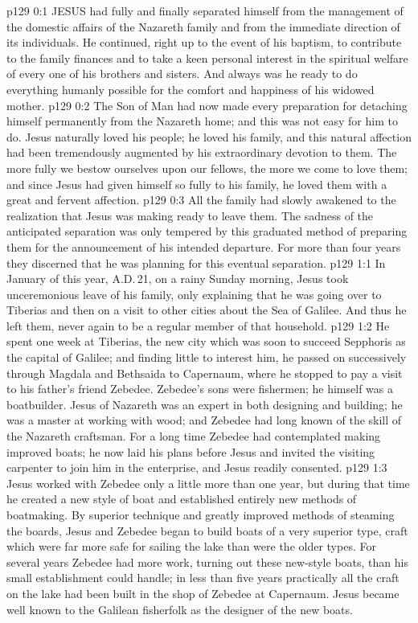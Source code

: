\vs p129 0:1 JESUS had fully and finally separated himself from the management of the domestic affairs of the Nazareth family and from the immediate direction of its individuals. He continued, right up to the event of his baptism, to contribute to the family finances and to take a keen personal interest in the spiritual welfare of every one of his brothers and sisters. And always was he ready to do everything humanly possible for the comfort and happiness of his widowed mother.
\vs p129 0:2 The Son of Man had now made every preparation for detaching himself permanently from the Nazareth home; and this was not easy for him to do. Jesus naturally loved his people; he loved his family, and this natural affection had been tremendously augmented by his extraordinary devotion to them. The more fully we bestow ourselves upon our fellows, the more we come to love them; and since Jesus had given himself so fully to his family, he loved them with a great and fervent affection.
\vs p129 0:3 All the family had slowly awakened to the realization that Jesus was making ready to leave them. The sadness of the anticipated separation was only tempered by this graduated method of preparing them for the announcement of his intended departure. For more than four years they discerned that he was planning for this eventual separation.
\vs p129 1:1 In January of this year, A.D.\,21, on a rainy Sunday morning, Jesus took unceremonious leave of his family, only explaining that he was going over to Tiberias and then on a visit to other cities about the Sea of Galilee. And thus he left them, never again to be a regular member of that household.
\vs p129 1:2 He spent one week at Tiberias, the new city which was soon to succeed Sepphoris as the capital of Galilee; and finding little to interest him, he passed on successively through Magdala and Bethsaida to Capernaum, where he stopped to pay a visit to his father’s friend Zebedee. Zebedee’s sons were fishermen; he himself was a boatbuilder. Jesus of Nazareth was an expert in both designing and building; he was a master at working with wood; and Zebedee had long known of the skill of the Nazareth craftsman. For a long time Zebedee had contemplated making improved boats; he now laid his plans before Jesus and invited the visiting carpenter to join him in the enterprise, and Jesus readily consented.
\vs p129 1:3 Jesus worked with Zebedee only a little more than one year, but during that time he created a new style of boat and established entirely new methods of boatmaking. By superior technique and greatly improved methods of steaming the boards, Jesus and Zebedee began to build boats of a very superior type, craft which were far more safe for sailing the lake than were the older types. For several years Zebedee had more work, turning out these new\hyp{}style boats, than his small establishment could handle; in less than five years practically all the craft on the lake had been built in the shop of Zebedee at Capernaum. Jesus became well known to the Galilean fisherfolk as the designer of the new boats.
